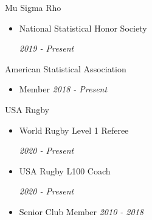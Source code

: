 
\Affiliation
{Mu Sigma Rho}
{\begin{itemize}
   \item National Statistical Honor Society \newline \strut\hfill
   \emph{2019 - Present}
\end{itemize}}

\Affiliation
{American Statistical Association}
{\begin{itemize}
   \item Member \hfill \emph{2018 - Present}
\end{itemize}}


\Affiliation
{USA Rugby}
{\begin{itemize}
   \item World Rugby Level 1 Referee \newline \strut\hfill \emph{2020 - Present}
   \item USA Rugby L100 Coach \newline \strut\hfill \emph{2020 - Present}
   \item Senior Club Member \hfill \emph{2010 - 2018}
\end{itemize}}

